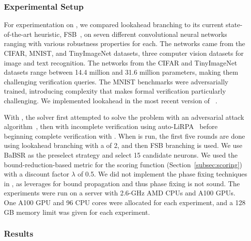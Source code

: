 \documentclass{article}
\begin{document}
\subsubsection{Experimental Setup}
For experimentation on \abcrown, we compared lookahead branching to its current state-of-the-art heuristic, FSB~\cite{de2021scaling}, on seven different convolutional neural networks ranging with various robustness properties for each. The networks came from the CIFAR, MNIST, and TinyImageNet datasets, three computer vision datasets for image and text recognition. The networks from the CIFAR and TinyImageNet datasets range between 14.4 million and 31.6 million parameters, making them challenging verification queries. The MNIST benchmarks were adversarially trained, introducing complexity that makes formal verification particularly challenging. We implemented lookahead in the most recent version of \abcrown ~\cite{zhou2025clipandverify}. 

With \abcrown, the solver first attempted to solve the problem with an adversarial attack algorithm~\cite{zhang22babattack}, then with incomplete verification using auto-LiRPA~\cite{xu2021fast} before beginning complete verification with \bab. When \bab is run, the first five \bab rounds are done using lookahead branching with a \paramDepth of 2, and then FSB branching is used. We use BaBSR as the preselect strategy and select 15 candidate neurons.  We used the bound-reduction-based metric for the scoring function (Section~\ref{subsec:scoring}) with a discount factor $\lambda$ of 0.5. We did not implement the phase fixing techniques in \abcrown, as \abcrown leverages \acrown for bound propagation and thus phase fixing is not sound. The experiments were run on a server with 2.6-GHz AMD CPUs and A100 GPUs. One A100 GPU and 96 CPU cores were allocated for each experiment, and a 128 GB memory limit was given for each experiment.

\subsubsection{Results}
\end{document}
